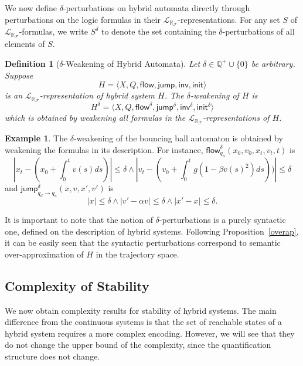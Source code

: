 \documentclass[12pt]{article}
\theoremstyle{plain}
\newtheorem{definition}[theorem]{Definition}
\theoremstyle{definition}
\newtheorem{example}[theorem]{Example}
\newcommand{\flow}{\mathsf{flow}}
\newcommand{\jump}{\mathsf{jump}}
\newcommand{\inv}{\mathsf{inv}}
\newcommand{\init}{\mathsf{init}}
\newcommand{\lrf}{\mathcal{L}_{\mathbb{R}_{\mathcal{F}}}}
\begin{document}
We now define $\delta$-perturbations on hybrid automata directly through perturbations on the logic formulas in their $\lrf$-representations. For any set $S$ of $\lrf$-formulas, we write $S^{\delta}$ to denote the set containing the $\delta$-perturbations of all elements of $S$.
\begin{definition}[$\delta$-Weakening of Hybrid Automata] Let $\delta\in\mathbb{Q}^+\cup\{0\}$ be arbitrary. Suppose
$$H = \langle X, Q, \flow, \jump, \inv, \init\rangle$$
is an $\lrf$-representation of hybrid system $H$. The {\em $\delta$-weakening} of $H$ is
$$H^{\delta} = \langle X, Q, \flow^{\delta}, \jump^{\delta}, \inv^{\delta}, \init^{\delta}\rangle$$
which is obtained by weakening all formulas in the $\lrf$-representations of $H$.
\end{definition}
\begin{example}
The $\delta$-weakening of the bouncing ball automaton is obtained by weakening the formulas in its description. For instance, $\flow_{q_u}^{\delta}(x_0, v_0, x_t, v_t, t)$ is
{$$|x_t - (x_0 + \int_0^{t} v(s) ds)|\leq \delta \wedge |v_t - (v_0 + \int_0^t g(1-\beta v(s)^2) ds))|\leq \delta$$}
and $\jump_{q_d \rightarrow q_u}^{\delta} (x, v, x', v')$ is {$$|x|\leq \delta \wedge |v' - \alpha v|\leq \delta \wedge |x'-x|\leq \delta.$$}
\end{example}
It is important to note that the notion of $\delta$-perturbations is a purely syntactic one, defined on the description of hybrid systems. Following Proposition~\ref{overap}, it can be easily seen that the syntactic perturbations correspond to semantic over-approximation of $H$ in the trajectory space.

\subsection{Complexity of Stability}
We now obtain complexity results for stability of hybrid systems. The main difference from the continuous systems is that the set of reachable states of a hybrid system requires a more complex encoding. However, we will see that they do not change the upper bound of the complexity, since the quantification structure does not change.
\end{document}
